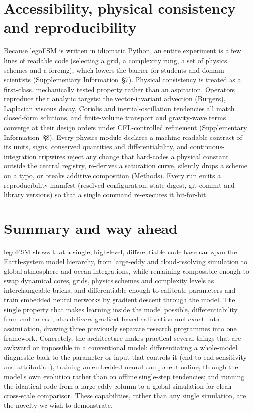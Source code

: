 \documentclass[11pt]{article}
\begin{document}
\section*{Accessibility, physical consistency and reproducibility}
Because legoESM is written in idiomatic Python, an entire experiment is a few lines of readable
code (selecting a grid, a complexity rung, a set of physics schemes and a forcing), which lowers
the barrier for students and domain scientists (Supplementary Information~\S7). Physical
consistency is treated as a first-class, mechanically tested property rather than an aspiration.
Operators reproduce their analytic targets: the vector-invariant advection (Burgers), Laplacian
viscous decay, Coriolis and inertial-oscillation tendencies all match closed-form solutions, and
finite-volume transport and gravity-wave terms converge at their design orders under
CFL-controlled refinement (Supplementary Information~\S8). Every physics module declares a
machine-readable contract of its units, signs, conserved quantities and differentiability, and
continuous-integration tripwires reject any change that hard-codes a physical constant outside
the central registry, re-derives a saturation curve, silently drops a scheme on a typo, or
breaks additive composition (Methods). Every run emits a reproducibility manifest (resolved
configuration, state digest, git commit and library versions) so that a single command
re-executes it bit-for-bit.

\section*{Summary and way ahead}
legoESM shows that a single, high-level, differentiable code base can span the Earth-system model
hierarchy, from large-eddy and cloud-resolving simulation to global atmosphere and ocean
integrations, while remaining composable enough to swap dynamical cores, grids, physics schemes and
complexity levels as interchangeable bricks, and differentiable enough to calibrate parameters and
train embedded neural networks by gradient descent through the model. The single property
that makes learning inside the model possible, differentiability from end to end, also
delivers gradient-based calibration and exact data assimilation, drawing three previously
separate research programmes into one framework. Concretely, the architecture makes practical
several things that are awkward or impossible in a conventional model: differentiating a
whole-model diagnostic back to the parameter or input that controls it (end-to-end sensitivity
and attribution); training an embedded neural component online, through the model's own
evolution rather than on offline single-step tendencies; and running the identical code from a
large-eddy column to a global simulation for clean cross-scale comparison. These capabilities,
rather than any single simulation, are the novelty we wish to demonstrate.
\end{document}
